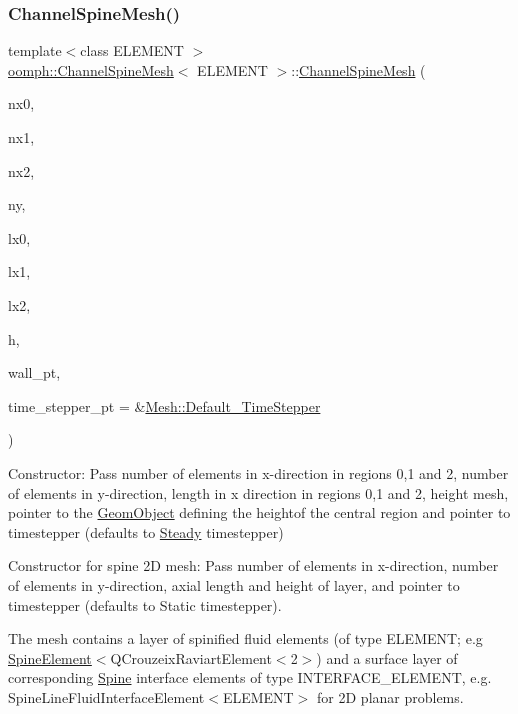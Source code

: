 \subsubsection{\texorpdfstring{Channel\+Spine\+Mesh()}{ChannelSpineMesh()}\hspace{0.1cm}{\footnotesize\ttfamily [1/2]}}
{\footnotesize\ttfamily template$<$class E\+L\+E\+M\+E\+NT $>$ \\
\hyperlink{classoomph_1_1ChannelSpineMesh}{oomph\+::\+Channel\+Spine\+Mesh}$<$ E\+L\+E\+M\+E\+NT $>$\+::\hyperlink{classoomph_1_1ChannelSpineMesh}{Channel\+Spine\+Mesh} (\begin{DoxyParamCaption}\item[{const unsigned \&}]{nx0,  }\item[{const unsigned \&}]{nx1,  }\item[{const unsigned \&}]{nx2,  }\item[{const unsigned \&}]{ny,  }\item[{const double \&}]{lx0,  }\item[{const double \&}]{lx1,  }\item[{const double \&}]{lx2,  }\item[{const double \&}]{h,  }\item[{\hyperlink{classoomph_1_1GeomObject}{Geom\+Object} $\ast$}]{wall\+\_\+pt,  }\item[{\hyperlink{classoomph_1_1TimeStepper}{Time\+Stepper} $\ast$}]{time\+\_\+stepper\+\_\+pt = {\ttfamily \&\hyperlink{classoomph_1_1Mesh_a12243d0fee2b1fcee729ee5a4777ea10}{Mesh\+::\+Default\+\_\+\+Time\+Stepper}} }\end{DoxyParamCaption})}



Constructor\+: Pass number of elements in x-\/direction in regions 0,1 and 2, number of elements in y-\/direction, length in x direction in regions 0,1 and 2, height mesh, pointer to the \hyperlink{classoomph_1_1GeomObject}{Geom\+Object} defining the heightof the central region and pointer to timestepper (defaults to \hyperlink{classoomph_1_1Steady}{Steady} timestepper) 

Constructor for spine 2D mesh\+: Pass number of elements in x-\/direction, number of elements in y-\/direction, axial length and height of layer, and pointer to timestepper (defaults to Static timestepper).

The mesh contains a layer of spinified fluid elements (of type E\+L\+E\+M\+E\+NT; e.\+g \hyperlink{classoomph_1_1SpineElement}{Spine\+Element}$<$Q\+Crouzeix\+Raviart\+Element$<$2$>$) and a surface layer of corresponding \hyperlink{classoomph_1_1Spine}{Spine} interface elements of type I\+N\+T\+E\+R\+F\+A\+C\+E\+\_\+\+E\+L\+E\+M\+E\+NT, e.\+g. Spine\+Line\+Fluid\+Interface\+Element$<$\+E\+L\+E\+M\+E\+N\+T$>$ for 2D planar problems. 

